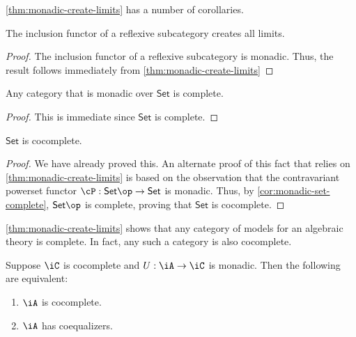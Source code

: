\documentclass{amsart}
\begin{document}
\cref{thm:monadic-create-limits} has a number of corollaries.

\begin{cor}
  The inclusion functor of a reflexive subcategory creates all limits.
\end{cor}
\begin{proof}
  The inclusion functor of a reflexive subcategory is monadic.
  Thus, the result follows immediately from \cref{thm:monadic-create-limits}
\end{proof}

\begin{cor}\label{cor:monadic-set-complete}
  Any category that is monadic over $\mathsf{Set}$ is complete.
\end{cor}
\begin{proof}
  This is immediate since $\mathsf{Set}$ is complete.
\end{proof}

\begin{cor}
  $\mathsf{Set}$ is cocomplete.
\end{cor}
\begin{proof}
  We have already proved this.
  An alternate proof of this fact that relies on \cref{thm:monadic-create-limits} is based on the observation that the contravariant powerset functor $\cP : \mathsf{Set}\op \to \mathsf{Set}$ is monadic.
  Thus, by \cref{cor:monadic-set-complete}, $\mathsf{Set}\op$ is complete, proving that $\mathsf{Set}$ is cocomplete.
\end{proof}

\cref{thm:monadic-create-limits} shows that any category of models for an algebraic theory is complete.
In fact, any such a category is also cocomplete.

\begin{thm}
  Suppose $\iC$ is cocomplete and $U : \iA \to \iC$ is monadic.
  Then the following are equivalent:
  \begin{enumerate}
  \item $\iA$ is cocomplete.
  \item $\iA$ has coequalizers.
  \end{enumerate}
\end{thm}



\end{document}
